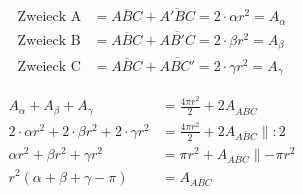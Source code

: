 \begin{refsection}
\begin{align*}
\text{Zweieck A}
&=
\overline{ABC} + \overline{A'BC} = 2\cdot \alpha r^{ 2 } = A_{ \alpha }\\
\text{Zweieck B}
&=
\overline{ABC} + \overline{AB'C} = 2\cdot \beta r^{ 2 } = A_{ \beta }\\
\text{Zweieck C}
&=
\overline{ABC} + \overline{ABC'} = 2\cdot \gamma r^{ 2 } = A_{ \gamma }
\end{align*}

\begin{align*}
A_{ \alpha } + A_{ \beta } + A_{ \gamma }
&=
\frac{ 4\pi r^{ 2 } }{ 2 } + 2A_{ \overline{ ABC }} 
\\
2\cdot \alpha r^{ 2 } + 2\cdot \beta r^{ 2 } + 2\cdot \gamma r^{ 2 }
&=
\frac{ 4\pi r^{ 2 } }{ 2 } + 2A_{ \overline{ ABC }} \parallel:2
\\
\alpha r^{ 2 } + \beta r^{ 2 } + \gamma r^{ 2 }
&=
\pi r^{ 2 } + A_{ \overline{ ABC }} \parallel-\pi r^{ 2 }
\\
r^{ 2 } \left(\alpha + \beta + \gamma - \pi\right)
&=
A_{ \overline{ ABC }}
\end{align*}



\printbibliography[heading=subbibliography]
\end{refsection}



